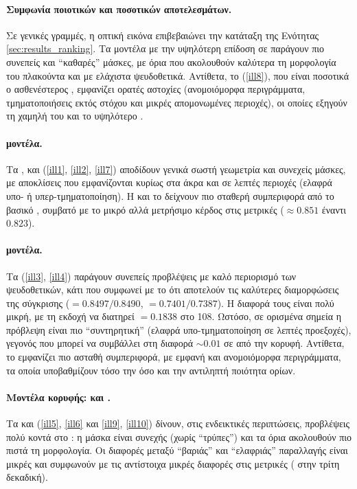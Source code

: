 \paragraph{Συμφωνία ποιοτικών και ποσοτικών αποτελεσμάτων.}
Σε γενικές γραμμές, η οπτική εικόνα επιβεβαιώνει την κατάταξη της
Ενότητας \ref{sec:results_ranking}. Τα μοντέλα με την υψηλότερη επίδοση σε
 παράγουν πιο συνεπείς και
``καθαρές'' μάσκες, με όρια που ακολουθούν καλύτερα τη μορφολογία του
πλακούντα και με ελάχιστα ψευδοθετικά. Αντίθετα, το  (\ref{ill8}), που είναι
ποσοτικά ο ασθενέστερος , εμφανίζει ορατές αστοχίες (ανομοιόμορφα
περιγράμματα, τμηματοποιήσεις εκτός στόχου και μικρές απομονωμένες περιοχές),
οι οποίες εξηγούν τη χαμηλή του  και το υψηλότερο .

\paragraph{ μοντέλα.}
Τα ,  και  (\ref{ill1}, \ref{ill2}, \ref{ill7}) αποδίδουν γενικά σωστή
γεωμετρία και συνεχείς μάσκες, με αποκλίσεις που εμφανίζονται κυρίως στα άκρα
και σε λεπτές περιοχές (ελαφρά υπο- ή υπερ-τμηματοποίηση). Η 
και το  δείχνουν πιο σταθερή συμπεριφορά από το βασικό ,
συμβατό με το μικρό αλλά μετρήσιμο κέρδος στις μετρικές
($\approx 0.851$ έναντι $0.823$).

\paragraph{ μοντέλα.}
Τα  (\ref{ill3}, \ref{ill4}) παράγουν συνεπείς προβλέψεις με καλό
περιορισμό των ψευδοθετικών, κάτι που συμφωνεί με το ότι αποτελούν τις
καλύτερες  διαμορφώσεις της σύγκρισης
($=0.8497/0.8490$, $=0.7401/0.7387$). Η διαφορά τους είναι
πολύ μικρή, με τη  εκδοχή να διατηρεί $=0.1838$
στο  108. Ωστόσο, σε ορισμένα σημεία η πρόβλεψη είναι πιο
``συντηρητική'' (ελαφρά υπο-τμηματοποίηση σε λεπτές προεξοχές), γεγονός που
μπορεί να συμβάλλει στη διαφορά $\sim 0.01$ σε  από την κορυφή.
Αντίθετα, το  εμφανίζει πιο ασταθή
συμπεριφορά, με εμφανή  και ανομοιόμορφα περιγράμματα, τα
οποία υποβαθμίζουν τόσο την  όσο και την αντιληπτή ποιότητα ορίων.

\paragraph{Μοντέλα κορυφής:  και .}
Τα  και  (\ref{ill5}, \ref{ill6} και \ref{ill9}, \ref{ill10}) δίνουν, στις ενδεικτικές περιπτώσεις,
προβλέψεις πολύ κοντά στο : η μάσκα είναι συνεχής (χωρίς
``τρύπες'') και τα όρια ακολουθούν πιο πιστά τη μορφολογία. Οι διαφορές μεταξύ
``βαριάς'' και ``ελαφριάς'' παραλλαγής είναι μικρές και συμφωνούν με τις
αντίστοιχα μικρές διαφορές στις μετρικές ( στην τρίτη δεκαδική).

